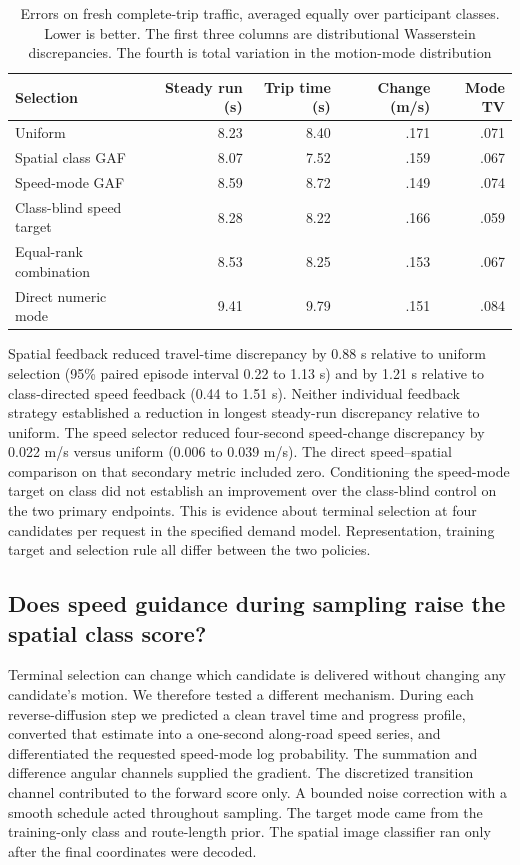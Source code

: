 \begin{table}[htbp]\centering\small\setlength{\tabcolsep}{3pt}
\caption{Errors on fresh complete-trip traffic, averaged equally over participant classes. Lower is better. The first three columns are distributional Wasserstein discrepancies. The fourth is total variation in the motion-mode distribution}
\begin{tabular}{lrrrr}\toprule
Selection & Steady run (s) & Trip time (s) & Change (m/s) & Mode TV\\\midrule
Uniform & 8.23 & 8.40 & .171 & .071\\
Spatial class GAF & 8.07 & 7.52 & .159 & .067\\
Speed-mode GAF & 8.59 & 8.72 & .149 & .074\\
Class-blind speed target & 8.28 & 8.22 & .166 & .059\\
Equal-rank combination & 8.53 & 8.25 & .153 & .067\\
Direct numeric mode & 9.41 & 9.79 & .151 & .084\\\bottomrule
\end{tabular}
\end{table}

Spatial feedback reduced travel-time discrepancy by 0.88 s relative to uniform selection (95\% paired episode interval 0.22 to 1.13 s) and by 1.21 s relative to class-directed speed feedback (0.44 to 1.51 s). Neither individual feedback strategy established a reduction in longest steady-run discrepancy relative to uniform. The speed selector reduced four-second speed-change discrepancy by 0.022 m/s versus uniform (0.006 to 0.039 m/s). The direct speed--spatial comparison on that secondary metric included zero. Conditioning the speed-mode target on class did not establish an improvement over the class-blind control on the two primary endpoints. This is evidence about terminal selection at four candidates per request in the specified demand model. Representation, training target and selection rule all differ between the two policies.

\subsection{Does speed guidance during sampling raise the spatial class score?}
Terminal selection can change which candidate is delivered without changing any candidate's motion. We therefore tested a different mechanism. During each reverse-diffusion step we predicted a clean travel time and progress profile, converted that estimate into a one-second along-road speed series, and differentiated the requested speed-mode log probability. The summation and difference angular channels supplied the gradient. The discretized transition channel contributed to the forward score only. A bounded noise correction with a smooth schedule acted throughout sampling. The target mode came from the training-only class and route-length prior. The spatial image classifier ran only after the final coordinates were decoded.

